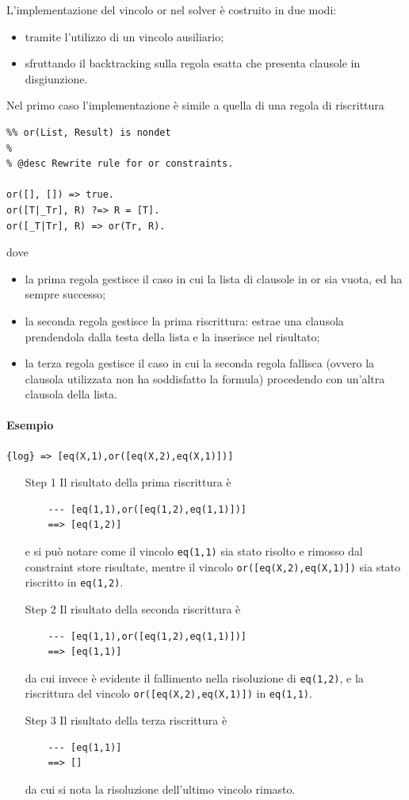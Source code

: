 \documentclass[12pt,a4paper,openright]{book} %
\begin{document}
L'implementazione del vincolo or nel solver è costruito in due modi:
\begin{itemize}
	\item tramite l'utilizzo di un vincolo ausiliario;
	\item sfruttando il backtracking sulla regola esatta che presenta clausole in disgiunzione.
\end{itemize}

Nel primo caso l'implementazione è simile a quella di una regola di riscrittura
\begin{verbatim}
%% or(List, Result) is nondet
%
% @desc Rewrite rule for or constraints.

or([], []) => true.
or([T|_Tr], R) ?=> R = [T].
or([_T|Tr], R) => or(Tr, R).
\end{verbatim}
dove
\begin{itemize}
	\item la prima regola gestisce il caso in cui la lista di clausole in or sia vuota, ed ha sempre successo;
	\item la seconda regola gestisce la prima riscrittura: estrae una clausola prendendola dalla testa della lista e la inserisce nel risultato;
	\item la terza regola gestisce il caso in cui la seconda regola fallisca (ovvero la clausola utilizzata non ha soddisfatto la formula) procedendo con un'altra clausola della lista.
\end{itemize}

\paragraph{Esempio}
\begin{verbatim}
{log} => [eq(X,1),or([eq(X,2),eq(X,1)])]
\end{verbatim}

\begin{itemize}
	
	\item[Step 1] Il risultato della prima riscrittura è
	\begin{verbatim}
	--- [eq(1,1),or([eq(1,2),eq(1,1)])]
	==> [eq(1,2)]
	\end{verbatim}
	e si può notare come il vincolo \verb|eq(1,1)| sia stato risolto e rimosso dal constraint store risultate, mentre il vincolo \verb|or([eq(X,2),eq(X,1)])| sia stato riscritto in \verb|eq(1,2)|.
	
	\item[Step 2] Il risultato della seconda riscrittura è
	\begin{verbatim}
	--- [eq(1,1),or([eq(1,2),eq(1,1)])]
	==> [eq(1,1)]
	\end{verbatim} 
	da cui invece è evidente il fallimento nella risoluzione di \verb|eq(1,2)|, e la riscrittura del vincolo \verb|or([eq(X,2),eq(X,1)])| in \verb|eq(1,1)|.
	
	\item[Step 3] Il risultato della terza riscrittura è
	\begin{verbatim}
	--- [eq(1,1)]
	==> []
	\end{verbatim}
	da cui si nota la risoluzione dell'ultimo vincolo rimasto.
	
\end{itemize}
\end{document}
